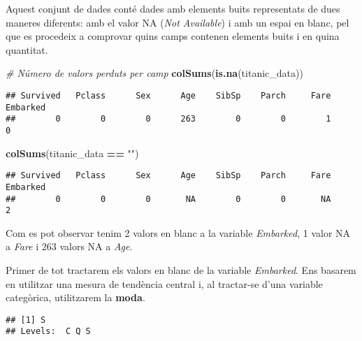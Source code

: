 \documentclass[]{article}
\newenvironment{Shaded}{\begin{snugshade}}{\end{snugshade}}
\newcommand{\CommentTok}[1]{\textcolor[rgb]{0.56,0.35,0.01}{\textit{#1}}}
\newcommand{\DataTypeTok}[1]{\textcolor[rgb]{0.13,0.29,0.53}{#1}}
\newcommand{\KeywordTok}[1]{\textcolor[rgb]{0.13,0.29,0.53}{\textbf{#1}}}
\newcommand{\NormalTok}[1]{#1}
\newcommand{\OperatorTok}[1]{\textcolor[rgb]{0.81,0.36,0.00}{\textbf{#1}}}
\newcommand{\StringTok}[1]{\textcolor[rgb]{0.31,0.60,0.02}{#1}}
\begin{document}
Aquest conjunt de dades conté dades amb elements buits representats de
dues maneres diferents: amb el valor NA (\emph{Not Available}) i amb un
espai en blanc, pel que es procedeix a comprovar quins camps contenen
elements buits i en quina quantitat.

\begin{Shaded}
\begin{Highlighting}[]
\CommentTok{# Número de valors perduts per camp}
\KeywordTok{colSums}\NormalTok{(}\KeywordTok{is.na}\NormalTok{(titanic_data))}
\end{Highlighting}
\end{Shaded}

\begin{verbatim}
## Survived   Pclass      Sex      Age    SibSp    Parch     Fare Embarked 
##        0        0        0      263        0        0        1        0
\end{verbatim}

\begin{Shaded}
\begin{Highlighting}[]
\KeywordTok{colSums}\NormalTok{(titanic_data }\OperatorTok{==}\StringTok{ ""}\NormalTok{)}
\end{Highlighting}
\end{Shaded}

\begin{verbatim}
## Survived   Pclass      Sex      Age    SibSp    Parch     Fare Embarked 
##        0        0        0       NA        0        0       NA        2
\end{verbatim}

Com es pot observar tenim 2 valors en blanc a la variable
\emph{Embarked}, 1 valor NA a \emph{Fare} i 263 valors NA a \emph{Age}.

Primer de tot tractarem els valors en blanc de la variable
\emph{Embarked}. Ens basarem en utilitzar una mesura de tendència
central i, al tractar-se d'una variable categòrica, utilitzarem la
\textbf{moda}.

\begin{Shaded}
\end{Shaded}

\begin{verbatim}
## [1] S
## Levels:  C Q S
\end{verbatim}
\end{document}
